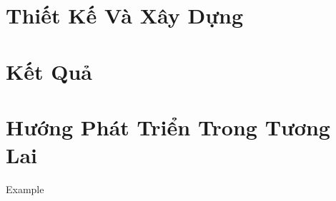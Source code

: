 \documentclass[14pt]{hcmutarticle}
\begin{document}
\chapter{Thiết Kế Và Xây Dựng}


\chapter{Kết Quả}


\chapter{Hướng Phát Triển Trong Tương Lai}



\newpage
{}
\begin{thebibliography}{}

\bibitem{}
Example


\end{thebibliography}
\end{document}
